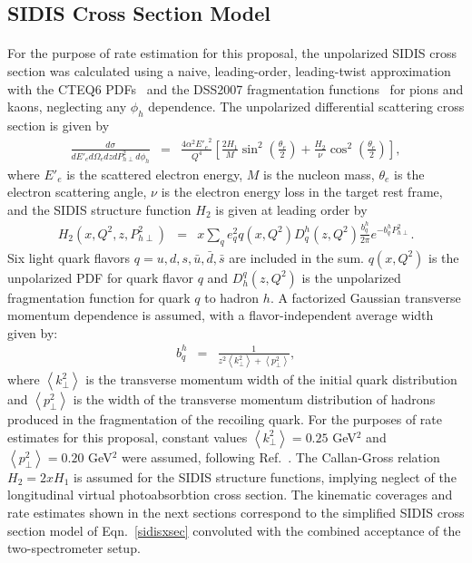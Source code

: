 \subsection{SIDIS Cross Section Model}
\paragraph{}
For the purpose of rate estimation for this proposal, the unpolarized SIDIS cross section was calculated using a naive, leading-order, leading-twist approximation with the CTEQ6 PDFs~\cite{CTEQ6} and the DSS2007 fragmentation functions~\cite{DSS2007} for pions and kaons, neglecting any $\phi_h$ dependence. The unpolarized differential scattering cross section is given by 
\begin{eqnarray}
  \frac{d\sigma}{dE'_e d\Omega_e dz dP^2_{h\perp} d\phi_h} &=& \frac{4\alpha^2 {E'_e}^2}{Q^4}\left[\frac{2H_1}{M} \sin^2 \left(\frac{\theta_e}{2}\right) + \frac{H_2}{\nu} \cos^2\left(\frac{\theta_e}{2}\right)\right], \label{sidisxsec}
\end{eqnarray}
where $E'_e$ is the scattered electron energy, $M$ is the nucleon mass, $\theta_e$ is the electron scattering angle, $\nu$ is the electron energy loss in the target rest frame, and the SIDIS structure function $H_2$ is given at leading order by
\begin{eqnarray}
  H_2(x, Q^2, z, P^2_{h\perp}) &=& x \sum_q e_q^2 q(x,Q^2) D^h_q(z,Q^2) \frac{b_q^h}{2\pi}e^{-b_q^h P^2_{h\perp}}.
\end{eqnarray}
Six light quark flavors $q = u,d,s, \bar{u}, \bar{d}, \bar{s}$ are included in the sum. $q(x,Q^2)$ is the unpolarized PDF for quark flavor $q$ and $D_h^q(z,Q^2)$ is the unpolarized fragmentation function for quark $q$ to hadron $h$. A factorized Gaussian transverse momentum dependence is assumed, with a flavor-independent average width given by:
\begin{eqnarray}
  b_q^h &=& \frac{1}{z^2\left<k^2_\perp\right> + \left<p_\perp^2 \right>}, 
\end{eqnarray}
where $\left<k^2_\perp\right>$ is the transverse momentum width of the initial quark distribution and $ \left<p_\perp^2 \right>$ is the width of the transverse momentum distribution of hadrons produced in the fragmentation of the recoiling quark. For the purposes of rate estimates for this proposal, constant values $\left<k^2_\perp\right> = 0.25$ GeV$^2$ and  $ \left<p_\perp^2 \right> = 0.20$ GeV$^2$ were assumed, following Ref.~\cite{PhysRevD.71.074006}. The Callan-Gross relation $H_2 = 2xH_1$ is assumed for the SIDIS structure functions, implying neglect of the longitudinal virtual photoabsorbtion cross section. The kinematic coverages and rate estimates shown in the next sections correspond to the simplified SIDIS cross section model of Eqn.~\eqref{sidisxsec} convoluted with the combined acceptance of the two-spectrometer setup.
